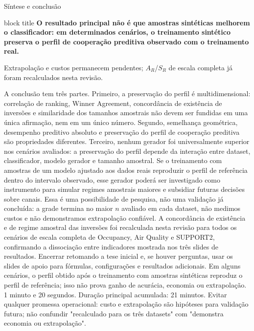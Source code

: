 \begin{frame}{Síntese e conclusão}
  \vspace{0.08cm}

  \vspace{0.06cm}
  \begin{beamercolorbox}[wd=\linewidth,sep=.10cm,rounded=true]{block title}
    \centering\bfseries\fontsize{9.0}{10.8}\selectfont
    O resultado principal não é que amostras sintéticas melhorem o classificador: em determinados cenários, o treinamento sintético preserva o perfil de cooperação preditiva observado com o treinamento real.
  \end{beamercolorbox}

  \vspace{0.02cm}
  {\centering\fontsize{6.8}{8.0}\selectfont\color{CoInfoGray}
    Extrapolação e custos permanecem pendentes; $A_R$/$S_R$ de escala completa já foram recalculados nesta revisão.\par}

  \speakernotes
    {A conclusão tem três partes. Primeiro, a preservação do perfil é multidimensional: correlação de ranking, Winner Agreement, concordância de existência de inversões e similaridade dos tamanhos amostrais não devem ser fundidas em uma única afirmação, nem em um único número. Segundo, semelhança geométrica, desempenho preditivo absoluto e preservação do perfil de cooperação preditiva são propriedades diferentes. Terceiro, nenhum gerador foi universalmente superior nos cenários avaliados: a preservação do perfil depende da interação entre dataset, classificador, modelo gerador e tamanho amostral. Se o treinamento com amostras de um modelo ajustado aos dados reais reproduzir o perfil de referência dentro do intervalo observado, esse gerador poderá ser investigado como instrumento para simular regimes amostrais maiores e subsidiar futuras decisões sobre canais. Essa é uma possibilidade de pesquisa, não uma validação já concluída: a grade termina no maior $n$ avaliado em cada dataset, não medimos custos e não demonstramos extrapolação confiável. A concordância de existência e de regime amostral das inversões foi recalculada nesta revisão para todos os cenários de escala completa de Occupancy, Air Quality e SUPPORT2, confirmando a dissociação entre indicadores mostrada nos três slides de resultados.}
    {Encerrar retomando a tese inicial e, se houver perguntas, usar os slides de apoio para fórmulas, configurações e resultados adicionais.}
    {Em alguns cenários, o perfil obtido após o treinamento com amostras sintéticas reproduz o perfil de referência; isso não prova ganho de acurácia, economia ou extrapolação.}
    {1 minuto e 20 segundos. Duração principal acumulada: 21 minutos.}
    {Evitar qualquer promessa operacional: custo e extrapolação são hipóteses para validação futura; não confundir "recalculado para os três datasets" com "demonstra economia ou extrapolação".}
\end{frame}
